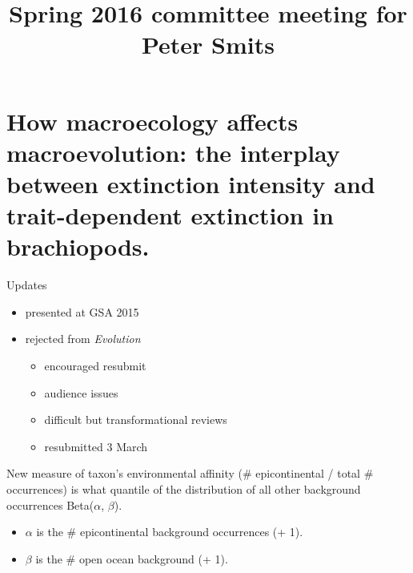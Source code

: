 \documentclass{beamer}
\title{Spring 2016 committee meeting for Peter Smits}
\author{}
\institute{}
\date{}
\begin{document}
\begin{frame}
  \maketitle
\end{frame}

\begin{frame}
  \tableofcontents
\end{frame}


\section{How macroecology affects macroevolution: the interplay between extinction intensity and trait-dependent extinction in brachiopods.}

\begin{frame}
  \begin{alertblock}{Updates}
    \begin{itemize}
      \item presented at GSA 2015
      \item rejected from \textit{Evolution}
        \begin{itemize}
          \item encouraged resubmit
          \item audience issues
          \item difficult but transformational reviews
          \item resubmitted 3 March
        \end{itemize}
    \end{itemize}
  \end{alertblock}
\end{frame}

\begin{frame}
  \begin{block}{New measure of taxon's environmental affinity}
    (\# epicontinental / total \# occurrences) is what quantile of the distribution of all other background occurrences Beta(\(\alpha\), \(\beta\)).
    \begin{itemize}
      \item \(\alpha\) is the \# epicontinental background occurrences (+ 1).
      \item \(\beta\) is the \# open ocean background (+ 1).
    \end{itemize}
  \end{block}
\end{frame}
\end{document}
